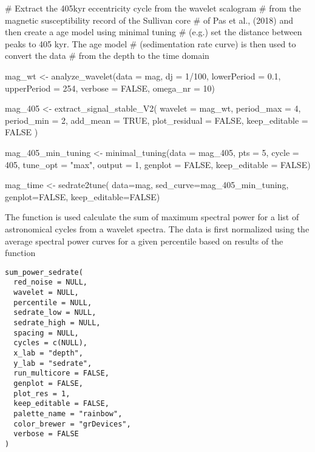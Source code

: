 \documentclass[a4paper]{book}
\begin{document}
\begin{Examples}
\begin{ExampleCode}

# Extract the 405kyr eccentricity cycle from the wavelet scalogram
# from the magnetic susceptibility record of the Sullivan core
# of Pas et al., (2018) and then create a age model using minimal tuning
# (e.g.) set the distance between peaks to 405 kyr. The age model
# (sedimentation rate curve) is then used to convert the data
# from the depth to the time domain

mag_wt <- analyze_wavelet(data = mag,
dj = 1/100,
lowerPeriod = 0.1,
upperPeriod = 254,
verbose = FALSE,
omega_nr = 10)


mag_405 <- extract_signal_stable_V2(
 wavelet = mag_wt,
 period_max = 4,
 period_min = 2,
 add_mean = TRUE,
 plot_residual = FALSE,
 keep_editable = FALSE
)

mag_405_min_tuning <- minimal_tuning(data = mag_405,
pts = 5,
cycle = 405,
tune_opt = "max",
output = 1,
genplot = FALSE,
keep_editable = FALSE)

mag_time <- sedrate2tune(
data=mag,
sed_curve=mag_405_min_tuning,
genplot=FALSE,
keep_editable=FALSE)


\end{ExampleCode}
\end{Examples}
%
\begin{Description}
The  function is used calculate the sum of
maximum spectral power for a list of astronomical cycles from a wavelet spectra.
The data is first normalized using the average spectral power curves
for a given percentile based on results of the  function
\end{Description}
%
\begin{Usage}
\begin{verbatim}
sum_power_sedrate(
  red_noise = NULL,
  wavelet = NULL,
  percentile = NULL,
  sedrate_low = NULL,
  sedrate_high = NULL,
  spacing = NULL,
  cycles = c(NULL),
  x_lab = "depth",
  y_lab = "sedrate",
  run_multicore = FALSE,
  genplot = FALSE,
  plot_res = 1,
  keep_editable = FALSE,
  palette_name = "rainbow",
  color_brewer = "grDevices",
  verbose = FALSE
)
\end{verbatim}
\end{Usage}
\end{document}
